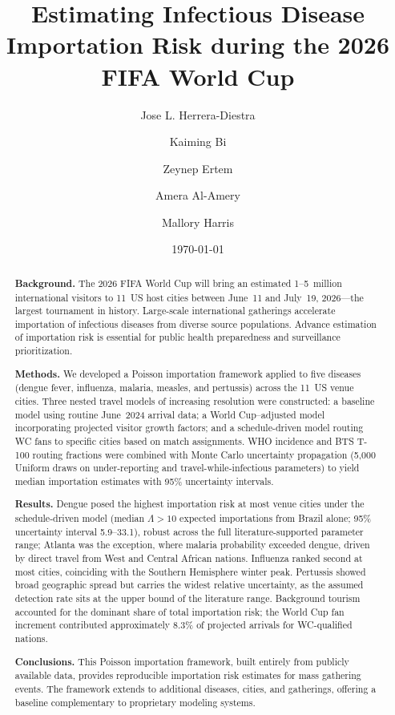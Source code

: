 \documentclass[12pt]{article}
\title{\textbf{Estimating Infectious Disease Importation Risk
during the 2026 FIFA World Cup}}
\author[1]{Jose L. Herrera-Diestra}
\author[2]{Kaiming Bi}
\author[4]{Zeynep Ertem}
\author[5]{Amera Al-Amery}
\author[3]{Mallory Harris}
\affil[1]{Tarleton State University, Stephenville, TX, USA}
\affil[2]{UTHealth Houston, Houston, TX, USA}
\affil[3]{University of Texas at Austin, Austin, TX, USA}
\affil[4]{Binghamton University, Binghamton, NY, USA}
\affil[5]{Jordan University of Science and Technology, Irbid, Jordan}
\date{\today}
\begin{document}
\maketitle
\linenumbers

\begin{abstract}
\noindent\textbf{Background.}
The 2026 FIFA World Cup will bring an estimated 1--5~million
international visitors to 11~US host cities between June~11 and
July~19, 2026---the largest tournament in history. Large-scale
international gatherings accelerate importation of infectious
diseases from diverse source populations. Advance estimation of
importation risk is essential for public health preparedness and
surveillance prioritization.

\medskip
\noindent\textbf{Methods.}
We developed a Poisson importation framework applied to five
diseases (dengue fever, influenza, malaria, measles, and pertussis)
across the 11~US venue cities. Three nested travel models of
increasing resolution were constructed: a baseline model using
routine June~2024 arrival data; a World Cup--adjusted model
incorporating projected visitor growth factors; and a
schedule-driven model routing WC fans to specific cities based on
match assignments. WHO incidence and BTS T-100 routing fractions were
combined with Monte Carlo uncertainty propagation (5,000 Uniform
draws on under-reporting and travel-while-infectious parameters)
to yield median importation estimates with 95\% uncertainty
intervals.

\medskip
\noindent\textbf{Results.}
Dengue posed the highest importation risk at most venue cities under
the schedule-driven model (median $\Lambda > 10$ expected importations
from Brazil alone; 95\% uncertainty interval 5.9--33.1), robust across the full literature-supported parameter range;
Atlanta was the exception, where malaria probability exceeded dengue,
driven by direct travel from West and Central African nations.
Influenza ranked second at most cities, coinciding with the Southern
Hemisphere winter peak. Pertussis showed broad geographic spread but
carries the widest relative uncertainty, as the assumed detection rate
sits at the upper bound of the literature range. Background tourism
accounted for the dominant share of total importation risk; the World
Cup fan increment contributed approximately 8.3\% of projected arrivals
for WC-qualified nations.

\medskip
\noindent\textbf{Conclusions.}
This Poisson importation framework, built entirely from publicly
available data, provides reproducible importation risk estimates for
mass gathering events. The framework extends to additional
diseases, cities, and gatherings, offering
a baseline complementary to proprietary modeling systems.
\end{abstract}
\end{document}
